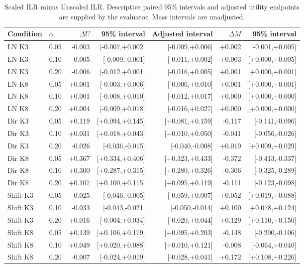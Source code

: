 \documentclass{article}
\begin{document}
\begin{table}[p]
\centering\scriptsize
\caption{Scaled ILR minus Unscaled ILR. Descriptive paired 95\% intervals and adjusted utility endpoints are supplied by the evaluator. Mass intervals are unadjusted.}
\begin{tabular}{llrrrrr}
\toprule
Condition & $\alpha$ & $\Delta U$ & 95\% interval & Adjusted interval & $\Delta M$ & 95\% interval \\
\midrule
LN K3 & 0.05 & -0.003 & [-0.007,+0.002] & [-0.009,+0.006] & +0.002 & [-0.001,+0.005] \\
LN K3 & 0.10 & -0.005 & [-0.009,-0.001] & [-0.011,+0.002] & +0.003 & [+0.000,+0.005] \\
LN K3 & 0.20 & -0.006 & [-0.012,+0.001] & [-0.016,+0.005] & +0.001 & [+0.000,+0.001] \\
LN K8 & 0.05 & +0.001 & [-0.003,+0.006] & [-0.006,+0.010] & +0.001 & [+0.000,+0.001] \\
LN K8 & 0.10 & +0.001 & [-0.008,+0.010] & [-0.012,+0.017] & +0.000 & [+0.000,+0.000] \\
LN K8 & 0.20 & +0.004 & [-0.009,+0.018] & [-0.016,+0.027] & +0.000 & [+0.000,+0.000] \\
Dir K3 & 0.05 & +0.119 & [+0.094,+0.145] & [+0.081,+0.159] & -0.117 & [-0.141,-0.096] \\
Dir K3 & 0.10 & +0.031 & [+0.018,+0.043] & [+0.010,+0.050] & -0.041 & [-0.056,-0.026] \\
Dir K3 & 0.20 & -0.026 & [-0.036,-0.015] & [-0.040,-0.008] & +0.019 & [+0.009,+0.029] \\
Dir K8 & 0.05 & +0.367 & [+0.334,+0.406] & [+0.323,+0.433] & -0.372 & [-0.413,-0.337] \\
Dir K8 & 0.10 & +0.300 & [+0.287,+0.315] & [+0.280,+0.326] & -0.306 & [-0.325,-0.289] \\
Dir K8 & 0.20 & +0.107 & [+0.100,+0.115] & [+0.095,+0.119] & -0.111 & [-0.123,-0.098] \\
Shift K3 & 0.05 & -0.025 & [-0.046,-0.005] & [-0.059,+0.007] & +0.052 & [+0.019,+0.088] \\
Shift K3 & 0.10 & -0.033 & [-0.043,-0.021] & [-0.050,-0.014] & +0.100 & [+0.078,+0.124] \\
Shift K3 & 0.20 & +0.016 & [-0.004,+0.034] & [-0.020,+0.044] & +0.129 & [+0.110,+0.150] \\
Shift K8 & 0.05 & +0.139 & [+0.106,+0.179] & [+0.095,+0.203] & -0.148 & [-0.200,-0.106] \\
Shift K8 & 0.10 & +0.049 & [+0.020,+0.088] & [+0.010,+0.121] & -0.008 & [-0.064,+0.040] \\
Shift K8 & 0.20 & -0.007 & [-0.024,+0.019] & [-0.028,+0.041] & +0.172 & [+0.108,+0.226] \\
\bottomrule
\end{tabular}
\end{table}
\end{document}
